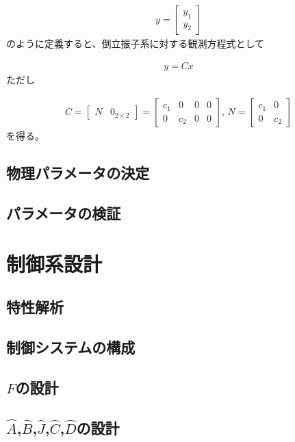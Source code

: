\documentclass[a4j,11pt,twoside]{ujbook}
\begin{document}
\begin{eqnarray*}
	y = \left[
	\begin{array}{c}
		y_1\\
		y_2
	\end{array}
	\right]
\end{eqnarray*}
のように定義すると、倒立振子系に対する観測方程式として

\begin{eqnarray*}
	y = Cx
\end{eqnarray*}
ただし

\begin{eqnarray}
C = \left[
\begin{array}{cc}
N & 0_{2×2}
\end{array}
\right] = \left[
\begin{array}{cccc}
c_1 &  0  & 0 & 0\\
0  & c_2 & 0 & 0
\end{array}
\right],\,
N = \left[
\begin{array}{cc}
c_1 &  0 \\
0  & c_2
\end{array}
\right]
\label{eq:C,N}
\end{eqnarray}
を得る。

\section{物理パラメータの決定}
\section{パラメータの検証}

\chapter{制御系設計}
\begin{figure}

\end{figure}
\section{特性解析}
\section{制御システムの構成}
\section{$F$の設計}
\section{$\hat{A}$,$\hat{B}$,$\hat{J}$,$\hat{C}$,$\hat{D}$の設計}
\end{document}
